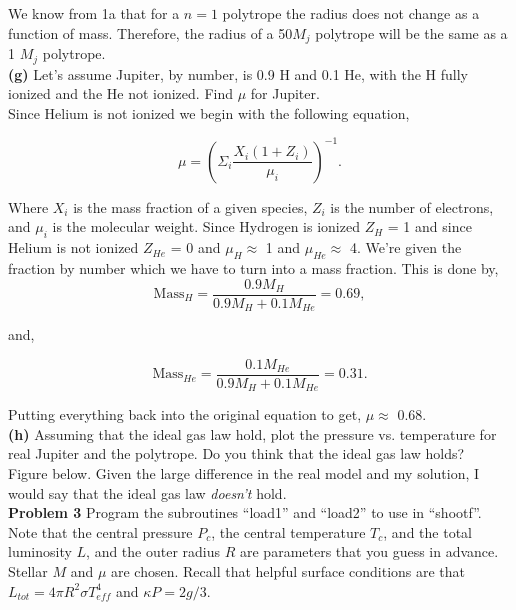 \documentclass[12pt]{article}
\begin{document}
\noindent We know from 1a that for a $n=1$ polytrope the radius does not change as a function of mass. Therefore, the radius of a 50$M_j$ polytrope will be the same as a 1 $M_j$ polytrope.\\

\noindent \textbf{(g)} Let's assume Jupiter, by number, is 0.9 H and 0.1 He, with the H fully ionized and the He not ionized. Find $\mu$ for Jupiter. \\

\noindent Since Helium is not ionized we begin with the following equation,

\begin{equation}
\mu = \left ( \Sigma_i  \frac{X_i \left( 1 + Z_i\right) }{\mu_i} \right)^{-1}.
\end{equation}

\noindent Where $X_i$ is the mass fraction of a given species, $Z_i$ is the number of electrons, and $\mu_i$ is the molecular weight. Since Hydrogen is ionized $Z_H$ = 1 and since Helium is not ionized $Z_{He}$ = 0 and $\mu_H \approx$  1 and $\mu_{He} \approx$  4. We're given the fraction by number which we have to turn into a mass fraction. This is done by, \\

\begin{equation}
\mathrm{Mass}_H = \frac{0.9M_H}{0.9M_H + 0.1M_{He}} = 0.69,
\end{equation}

and,

\begin{equation}
\mathrm{Mass}_{He} = \frac{0.1M_{He}}{0.9M_H + 0.1M_{He}} = 0.31.
\end{equation}

\noindent Putting everything back into the original equation to get, $\mu \approx$ 0.68.\\

\noindent \textbf{(h)} Assuming that the ideal gas law hold, plot the pressure vs. temperature for real Jupiter and the polytrope. Do you think that the ideal gas law holds?\\
 
\noindent Figure below. Given the large difference in the real model and my solution, I would say that the ideal gas law \textit{doesn't} hold.\\

\noindent \textbf{Problem 3} Program the subroutines ``load1'' and ``load2'' to use in ``shootf''. Note that the central pressure $P_c$, the central temperature $T_c$, and the total luminosity $L$, and the outer radius $R$ are parameters that you guess in advance. Stellar $M$ and $\mu$ are chosen. Recall that helpful surface conditions are that $L_{tot} = 4\pi R^2 \sigma T_{eff}^4$ and $\kappa P = 2g/3$. \\
\end{document}
